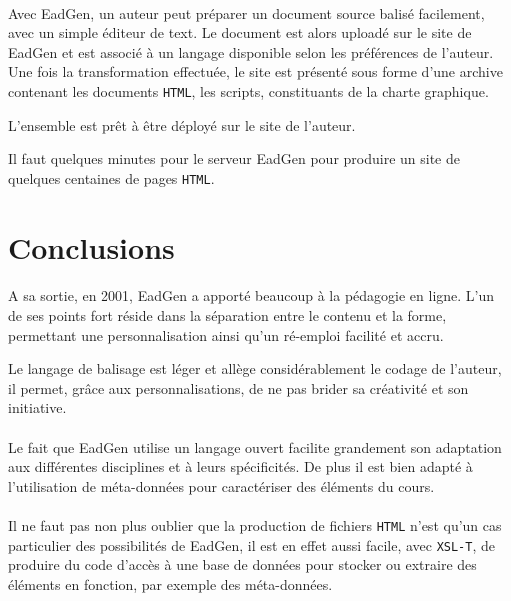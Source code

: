\paragraph{}Avec EadGen, un auteur peut préparer un document source balisé facilement, avec un simple éditeur de text. Le document est alors uploadé sur le site de EadGen et est associé à un langage disponible selon les préférences de l'auteur. Une fois la transformation effectuée, le site est présenté sous forme d'une archive contenant les documents \texttt{HTML}, les scripts, constituants de la charte graphique. 

L'ensemble est prêt à être déployé sur le site de l'auteur.

Il faut quelques minutes pour le serveur EadGen pour produire un site de quelques centaines de pages \texttt{HTML}.





\section{Conclusions}


\paragraph{}A sa sortie, en 2001, EadGen a apporté beaucoup à la pédagogie en ligne. L'un de ses points fort réside dans la séparation entre le contenu et la forme, permettant une personnalisation ainsi qu'un ré-emploi facilité et accru.


Le langage de balisage est léger et allège considérablement le codage de l'auteur, il permet, grâce aux personnalisations, de ne pas brider sa créativité et son initiative.


\paragraph{}Le fait que EadGen utilise un langage ouvert facilite grandement son adaptation aux différentes disciplines et à leurs spécificités. De plus il est bien adapté à l'utilisation de méta-données pour caractériser des éléments du cours. 


\paragraph{}Il ne faut pas non plus oublier que la production de fichiers \texttt{HTML} n'est qu'un cas particulier des possibilités de EadGen, il est en effet aussi facile, avec \texttt{XSL-T}, de produire du code d'accès à une base de données pour stocker ou extraire des éléments en fonction, par exemple des méta-données.